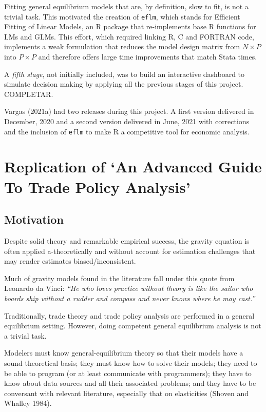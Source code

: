 \documentclass[12pt,reqno,oneside,pdftex]{formato-puc/puctesis} %
\begin{document}
Fitting general equilibrium models that are, by definition, slow to fit,
is not a trivial task. This motivated the creation of \texttt{eflm},
which stands for Efficient Fitting of Linear Models, an R package that
re-implements base R functions for LMs and GLMs. This effort, which
required linking R, C and FORTRAN code, implements a weak formulation
that reduces the model design matrix from \(N\times P\) into
\(P\times P\) and therefore offers large time improvements that match
Stata times.

A \emph{fifth stage}, not initially included, was to build an
interactive dashboard to simulate decision making by applying all the
previous stages of this project. COMPLETAR.

Vargas (2021a) had two releases during this project. A first version
delivered in December, 2020 and a second version delivered in June, 2021
with corrections and the inclusion of \texttt{eflm} to make R a
competitive tool for economic analysis.

\chapter{Replication of `An Advanced Guide To Trade Policy Analysis'}

\hypertarget{motivation}{%
\section{Motivation}\label{motivation}}

Despite solid theory and remarkable empirical success, the gravity
equation is often applied a-theoretically and without account for
estimation challenges that may render estimates biased/inconsistent.

Much of gravity models found in the literature fall under this quote
from Leonardo da Vinci: \emph{``He who loves practice without theory is
like the sailor who boards ship without a rudder and compass and never
knows where he may cast.''}

Traditionally, trade theory and trade policy analysis are performed in a
general equilibrium setting. However, doing competent general
equilibrium analysis is not a trivial task.

Modelers must know general-equilibrium theory so that their models have
a sound theoretical basis; they must know how to solve their models;
they need to be able to program (or at least communicate with
programmers); they have to know about data sources and all their
associated problems; and they have to be conversant with relevant
literature, especially that on elasticities (Shoven and Whalley 1984).
\end{document}
